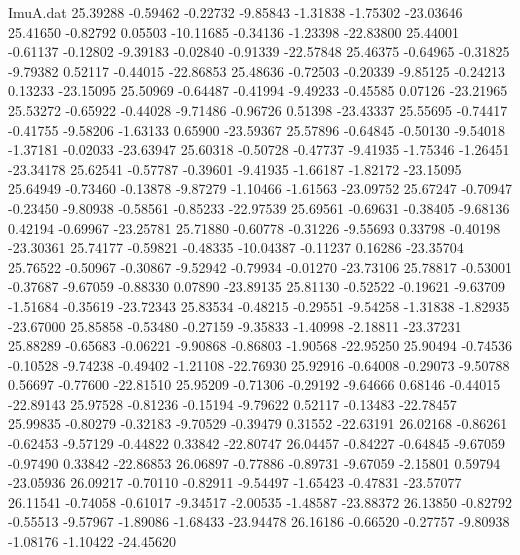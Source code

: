 \begin{filecontents}{ImuA.dat}
  25.39288   -0.59462   -0.22732   -9.85843   -1.31838   -1.75302  -23.03646
  25.41650   -0.82792    0.05503  -10.11685   -0.34136   -1.23398  -22.83800
  25.44001   -0.61137   -0.12802   -9.39183   -0.02840   -0.91339  -22.57848
  25.46375   -0.64965   -0.31825   -9.79382    0.52117   -0.44015  -22.86853
  25.48636   -0.72503   -0.20339   -9.85125   -0.24213    0.13233  -23.15095
  25.50969   -0.64487   -0.41994   -9.49233   -0.45585    0.07126  -23.21965
  25.53272   -0.65922   -0.44028   -9.71486   -0.96726    0.51398  -23.43337
  25.55695   -0.74417   -0.41755   -9.58206   -1.63133    0.65900  -23.59367
  25.57896   -0.64845   -0.50130   -9.54018   -1.37181   -0.02033  -23.63947
  25.60318   -0.50728   -0.47737   -9.41935   -1.75346   -1.26451  -23.34178
  25.62541   -0.57787   -0.39601   -9.41935   -1.66187   -1.82172  -23.15095
  25.64949   -0.73460   -0.13878   -9.87279   -1.10466   -1.61563  -23.09752
  25.67247   -0.70947   -0.23450   -9.80938   -0.58561   -0.85233  -22.97539
  25.69561   -0.69631   -0.38405   -9.68136    0.42194   -0.69967  -23.25781
  25.71880   -0.60778   -0.31226   -9.55693    0.33798   -0.40198  -23.30361
  25.74177   -0.59821   -0.48335  -10.04387   -0.11237    0.16286  -23.35704
  25.76522   -0.50967   -0.30867   -9.52942   -0.79934   -0.01270  -23.73106
  25.78817   -0.53001   -0.37687   -9.67059   -0.88330    0.07890  -23.89135
  25.81130   -0.52522   -0.19621   -9.63709   -1.51684   -0.35619  -23.72343
  25.83534   -0.48215   -0.29551   -9.54258   -1.31838   -1.82935  -23.67000
  25.85858   -0.53480   -0.27159   -9.35833   -1.40998   -2.18811  -23.37231
  25.88289   -0.65683   -0.06221   -9.90868   -0.86803   -1.90568  -22.95250
  25.90494   -0.74536   -0.10528   -9.74238   -0.49402   -1.21108  -22.76930
  25.92916   -0.64008   -0.29073   -9.50788    0.56697   -0.77600  -22.81510
  25.95209   -0.71306   -0.29192   -9.64666    0.68146   -0.44015  -22.89143
  25.97528   -0.81236   -0.15194   -9.79622    0.52117   -0.13483  -22.78457
  25.99835   -0.80279   -0.32183   -9.70529   -0.39479    0.31552  -22.63191
  26.02168   -0.86261   -0.62453   -9.57129   -0.44822    0.33842  -22.80747
  26.04457   -0.84227   -0.64845   -9.67059   -0.97490    0.33842  -22.86853
  26.06897   -0.77886   -0.89731   -9.67059   -2.15801    0.59794  -23.05936
  26.09217   -0.70110   -0.82911   -9.54497   -1.65423   -0.47831  -23.57077
  26.11541   -0.74058   -0.61017   -9.34517   -2.00535   -1.48587  -23.88372
  26.13850   -0.82792   -0.55513   -9.57967   -1.89086   -1.68433  -23.94478
  26.16186   -0.66520   -0.27757   -9.80938   -1.08176   -1.10422  -24.45620

\end{filecontents}
